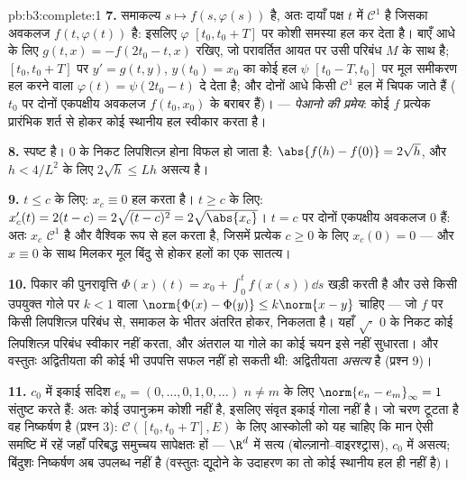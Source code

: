 \begin{solution}{pb:b3:complete:1}
\textbf{7.} समाकल्य $s \mapsto f(s, \varphi(s))$  है, अतः दायाँ पक्ष $t$ में $\mathcal C^1$
है जिसका अवकलज $f(t, \varphi(t))$ है: इसलिए $\varphi$ $[t_0, t_0 + T]$ पर कोशी समस्या हल कर
देता है। बाएँ आधे के लिए $g(t, x) =
-f(2t_0 - t, x)$ रखिए, जो परावर्तित आयत पर उसी परिबंध
$M$ के साथ  है; $[t_0, t_0 + T]$ पर $y' = g(t,y)$, $y(t_0) = x_0$ का कोई हल $\psi$ $[t_0 - T,
t_0]$
पर मूल समीकरण हल करने वाला $\varphi(t) =
\psi(2t_0 - t)$ दे देता है; और दोनों आधे किसी $\mathcal C^1$
हल में चिपक जाते हैं ($t_0$ पर दोनों एकपक्षीय अवकलज $f(t_0, x_0)$ के बराबर
हैं)। --- \emph{पेआनो की प्रमेय}: कोई  $f$ प्रत्येक प्रारंभिक
शर्त से होकर कोई स्थानीय हल स्वीकार करता है।

\textbf{8.}  स्पष्ट है। $0$ के निकट लिपशित्ज़ होना विफल हो
जाता है: $\abs{f(h) - f(0)} = 2\sqrt h$, और $h < 4/L^2$ के लिए $2\sqrt h \leq L h$ असत्य है।

\textbf{9.} $t \leq c$ के लिए: $x_c \equiv 0$ हल करता है। $t \geq
c$ के लिए: $x_c'(t) = 2(t - c) = 2\sqrt{(t-c)^2} = 2\sqrt{\abs{x_c}}$।
$t = c$ पर दोनों एकपक्षीय अवकलज $0$ हैं: अतः $x_c$ $\mathcal C^1$ है और
वैश्विक रूप से हल करता है, जिसमें प्रत्येक $c \geq 0$ के लिए $x_c(0) = 0$ ---
और $x \equiv 0$ के साथ मिलकर मूल बिंदु से होकर हलों का एक सातत्य।

\textbf{10.} पिकार की पुनरावृत्ति $\Phi(x)(t) = x_0 +
\int_0^t f(x(s))\dd s$ खड़ी करती है और उसे किसी
उपयुक्त गोले पर $k < 1$ वाला $\norm{\Phi(x) - \Phi(y)}
\leq k\norm{x - y}$ चाहिए --- जो $f$ पर किसी लिपशित्ज़
परिबंध से, समाकल के भीतर अंतरित होकर, निकलता है। यहाँ $\sqrt\cdot$ $0$
के निकट कोई लिपशित्ज़ परिबंध स्वीकार नहीं करता, और अंतराल या गोले
का कोई चयन इसे नहीं सुधारता। और वस्तुतः अद्वितीयता की कोई भी उपपत्ति
सफल नहीं हो सकती थी: अद्वितीयता \emph{असत्य} है (प्रश्न 9)।

\textbf{11.} $c_0$ में इकाई सदिश $e_n = (0, \dots, 0, 1,
0, \dots)$ $n \neq
m$ के लिए $\norm{e_n - e_m}_\infty = 1$ संतुष्ट
करते हैं: अतः कोई उपानुक्रम कोशी नहीं है, इसलिए संवृत इकाई गोला 
नहीं है। जो चरण टूटता है वह निष्कर्षण है (प्रश्न 3): $\mathcal C([t_0, t_0+T], E)$ के लिए
आस्कोली को यह चाहिए कि मान ऐसी समष्टि में रहें जहाँ परिबद्ध समुच्चय
सापेक्षतः  हों --- $\R^d$ में सत्य (बोल्ज़ानो--वाइरश्ट्रास), $c_0$
में असत्य; बिंदुशः निष्कर्षण अब उपलब्ध नहीं है (वस्तुतः द्यूदोने के
उदाहरण का तो कोई स्थानीय हल ही नहीं है)।


\end{solution}
